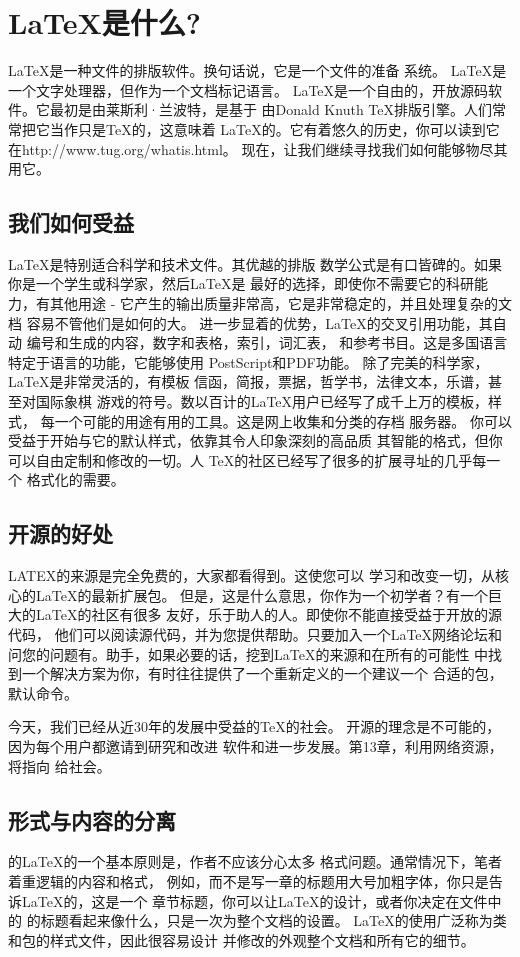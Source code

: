 \section{LaTeX是什么?}
LaTeX是一种文件的排版软件。换句话说，它是一个文件的准备
系统。 LaTeX是一个文字处理器，但作为一个文档标记语言。
LaTeX是一个自由的，开放源码软件。它最初是由莱斯利·兰波特，是基于
由Donald Knuth TeX排版引擎。人们常常把它当作只是TeX的，这意味着
LaTeX的。它有着悠久的历史，你可以读到它在http://www.tug.org/whatis.html。
现在，让我们继续寻找我们如何能够物尽其用它。
	\subsection{我们如何受益}
	LaTeX是特别适合科学和技术文件。其优越的排版
	数学公式是有口皆碑的。如果你是一个学生或科学家，然后LaTeX是
	最好的选择，即使你不需要它的科研能力，有其他用途 - 
	它产生的输出质量非常高，它是非常稳定的，并且处理复杂的文档
	容易不管他们是如何的大。
	进一步显着的优势，LaTeX的交叉引用功能，其自动
	编号和生成的内容，数字和表格，索引，词汇表，
	和参考书目。这是多国语言特定于语言的功能，它能够使用
	PostScript和PDF功能。
	除了完美的科学家，LaTeX是非常灵活的，有模板
	信函，简报，票据，哲学书，法律文本，乐谱，甚至对国际象棋
	游戏的符号。数以百计的LaTeX用户已经写了成千上万的模板，样式，
	每一个可能的用途有用的工具。这是网上收集和分类的存档
	服务器。
	你可以受益于开始与它的默认样式，依靠其令人印象深刻的高品质
	其智能的格式，但你可以自由定制和修改的一切。人
	TeX的社区已经写了很多的扩展寻址的几乎每一个
	格式化的需要。
	\subsection{开源的好处}
	LATEX的来源是完全免费的，大家都看得到。这使您可以
	学习和改变一切，从核心的LaTeX的最新扩展包。
	但是，这是什么意思，你作为一个初学者？有一个巨大的LaTeX的社区有很多
	友好，乐于助人的人。即使你不能直接受益于开放的源代码，
	他们可以阅读源代码，并为您提供帮助。只要加入一个LaTeX网络论坛和
	问您的问题有。助手，如果必要的话，挖到LaTeX的来源和在所有的可能性
	中找到一个解决方案为你，有时往往提供了一个重新定义的一个建议一个
	合适的包，默认命令。

	今天，我们已经从近30年的发展中受益的TeX的社会。
	开源的理念是不可能的，因为每个用户都邀请到研究和改进
	软件和进一步发展。第13章，利用网络资源，将指向
	给社会。	

	\subsection{形式与内容的分离}
	的LaTeX的一个基本原则是，作者不应该分心太多
	格式问题。通常情况下，笔者着重逻辑的内容和格式，
	例如，而不是写一章的标题用大号加粗字体，你只是告诉LaTeX的，这是一个
	章节标题，你可以让LaTeX的设计，或者你决定在文件中的
	的标题看起来像什么，只是一次为整个文档的设置。
	LaTeX的使用广泛称为类和包的样式文件，因此很容易设计
	并修改的外观整个文档和所有它的细节。	

